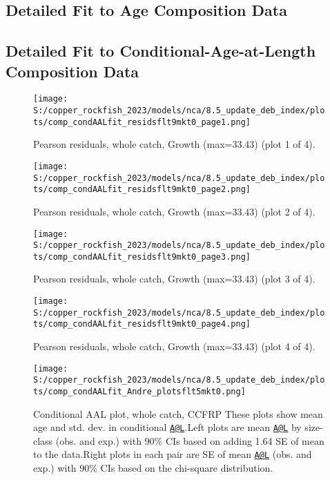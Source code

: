 \documentclass[11pt,
  english,
  letterpaper,
]{article}
\begin{document}
\newpage

\hypertarget{age-data}{%
\subsection{Detailed Fit to Age Composition Data}\label{age-data}}

\newpage

\hypertarget{caal-data}{%
\subsection{Detailed Fit to Conditional-Age-at-Length Composition Data}\label{caal-data}}

\begin{figure}
\centering
\texttt{[image: S:/copper\_rockfish\_2023/models/nca/8.5\_update\_deb\_index/plots/comp\_condAALfit\_residsflt9mkt0\_page1.png]}
\caption{Pearson residuals, whole catch, Growth (max=33.43) (plot 1 of 4).\label{fig:comp_condAALfit_residsflt9mkt0_page1}}
\end{figure}

\begin{figure}
\centering
\texttt{[image: S:/copper\_rockfish\_2023/models/nca/8.5\_update\_deb\_index/plots/comp\_condAALfit\_residsflt9mkt0\_page2.png]}
\caption{Pearson residuals, whole catch, Growth (max=33.43) (plot 2 of 4).\label{fig:comp_condAALfit_residsflt9mkt0_page2}}
\end{figure}

\begin{figure}
\centering
\texttt{[image: S:/copper\_rockfish\_2023/models/nca/8.5\_update\_deb\_index/plots/comp\_condAALfit\_residsflt9mkt0\_page3.png]}
\caption{Pearson residuals, whole catch, Growth (max=33.43) (plot 3 of 4).\label{fig:comp_condAALfit_residsflt9mkt0_page3}}
\end{figure}

\begin{figure}
\centering
\texttt{[image: S:/copper\_rockfish\_2023/models/nca/8.5\_update\_deb\_index/plots/comp\_condAALfit\_residsflt9mkt0\_page4.png]}
\caption{Pearson residuals, whole catch, Growth (max=33.43) (plot 4 of 4).\label{fig:comp_condAALfit_residsflt9mkt0_page4}}
\end{figure}

\begin{figure}
\centering
\texttt{[image: S:/copper\_rockfish\_2023/models/nca/8.5\_update\_deb\_index/plots/comp\_condAALfit\_Andre\_plotsflt5mkt0.png]}
\caption{Conditional AAL plot, whole catch, CCFRP These plots show mean age and std. dev. in conditional \href{mailto:A@L}{\nolinkurl{A@L}}.Left plots are mean \href{mailto:A@L}{\nolinkurl{A@L}} by size-class (obs. and exp.) with 90\% CIs based on adding 1.64 SE of mean to the data.Right plots in each pair are SE of mean \href{mailto:A@L}{\nolinkurl{A@L}} (obs. and exp.) with 90\% CIs based on the chi-square distribution.\label{fig:comp_condAALfit_Andre_plotsflt5mkt0}}
\end{figure}
\end{document}
